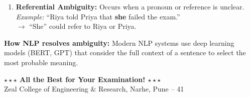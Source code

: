 \documentclass[12pt,a4paper]{article}
\newcommand{\term}[1]{\textbf{\color{headingcolor}#1}}
\begin{document}
\begin{answerenv}
\begin{enumerate}[leftmargin=1.8em, itemsep=7pt]
  \item \term{Referential Ambiguity:}
  Occurs when a pronoun or reference is unclear.\\
  \textit{Example:} ``Riya told Priya that \textbf{she} failed the exam.''\\
  $\to$ ``She'' could refer to Riya or Priya.
\end{enumerate}

\begin{keypoint}
\textbf{How NLP resolves ambiguity:} Modern NLP systems use deep learning models (BERT, GPT) that consider the full context of a sentence to select the most probable meaning.
\end{keypoint}

\end{answerenv}

\vspace{1cm}
\begin{center}
{\Large\bfseries\color{darkblue} $\star\star\star$ All the Best for Your Examination! $\star\star\star$}\\[0.4cm]
{\normalsize\color{gray} Zeal College of Engineering \& Research, Narhe, Pune -- 41}
\end{center}
\end{document}
